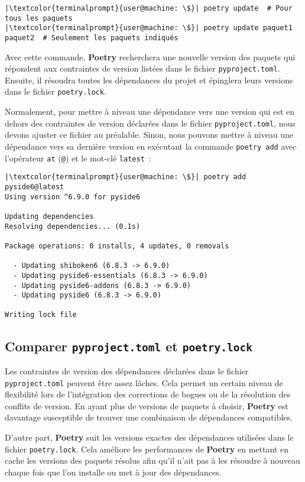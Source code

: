 \begin{lstlisting}[style=terminal]
|\textcolor{terminalprompt}{user@machine: \$}| poetry update  # Pour tous les paquets
|\textcolor{terminalprompt}{user@machine: \$}| poetry update paquet1 paquet2  # Seulement les paquets indiqués
\end{lstlisting}

Avec cette commande, \textbf{Poetry} recherchera une nouvelle version des paquets qui répondent aux contraintes de version listées dans le fichier \texttt{pyproject.toml}. Ensuite, il résoudra toutes les dépendances du projet et épinglera leurs versions dans le fichier \texttt{poetry.lock}. 

Normalement, pour mettre à niveau une dépendance vers une version qui est en dehors des contraintes de version déclarées dans le fichier \texttt{pyproject.toml}, nous devons ajuster ce fichier au préalable. Sinon, nous pouvons mettre à niveau une dépendance vers sa dernière version en exécutant la commande \texttt{poetry add} avec l’opérateur \texttt{at} (\texttt{@}) et le mot-clé \texttt{latest} :
\begin{lstlisting}[style=terminal]
|\textcolor{terminalprompt}{user@machine: \$}| poetry add pyside6@latest
Using version ^6.9.0 for pyside6

Updating dependencies
Resolving dependencies... (0.1s)

Package operations: 0 installs, 4 updates, 0 removals

  - Updating shiboken6 (6.8.3 -> 6.9.0)
  - Updating pyside6-essentials (6.8.3 -> 6.9.0)
  - Updating pyside6-addons (6.8.3 -> 6.9.0)
  - Updating pyside6 (6.8.3 -> 6.9.0)

Writing lock file
\end{lstlisting}

\subsection*{Comparer \texttt{pyproject.toml} et \texttt{poetry.lock}}

Les contraintes de version des dépendances déclarées dans le fichier \texttt{pyproject.toml} peuvent être assez lâches. Cela permet un certain niveau de flexibilité lors de l’intégration des corrections de bogues ou de la résolution des conflits de version. En ayant plus de versions de paquets à choisir, \textbf{Poetry} est davantage susceptible de trouver une combinaison de dépendances compatibles.

D’autre part, \textbf{Poetry} suit les versions exactes des dépendances utilisées dans le fichier \texttt{poetry.lock}. Cela améliore les performances de \textbf{Poetry} en mettant en cache les versions des paquets résolus afin qu’il n’ait pas à les résoudre à nouveau chaque fois que l'on installe ou met à jour des dépendances.

